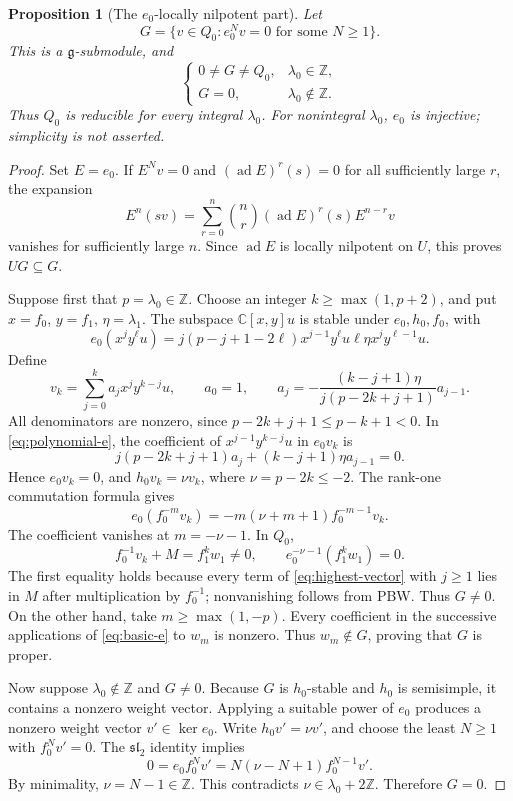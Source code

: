 \documentclass[11pt,a4paper]{article}
\newcommand{\C}{\mathbb C}
\newcommand{\Z}{\mathbb Z}
\newcommand{\g}{\mathfrak g}
\newcommand{\slc}{\mathfrak{sl}_2}
\newcommand{\ad}{\operatorname{ad}}
\theoremstyle{plainupright}
\newtheorem{proposition}{Proposition}[section]
\begin{document}
\begin{proposition}[The \(e_0\)-locally nilpotent part]\label{prop:integer}
Let
\[
G=\{v\in Q_0:e_0^Nv=0\text{ for some }N\ge1\}.
\]
This is a \(\g\)-submodule, and
\[
\begin{cases}
0\ne G\ne Q_0,&\lambda_0\in\Z,\\
G=0,&\lambda_0\notin\Z.
\end{cases}
\]
Thus \(Q_0\) is reducible for every integral \(\lambda_0\).
For nonintegral \(\lambda_0\), \(e_0\) is injective; simplicity is not
asserted.
\end{proposition}
\begin{proof}
Set \(E=e_0\). If \(E^Nv=0\) and \((\ad E)^r(s)=0\) for all sufficiently
large \(r\), the expansion
\[
E^n(sv)=\sum_{r=0}^n\binom nr(\ad E)^r(s)E^{n-r}v
\]
vanishes for sufficiently large \(n\). Since \(\ad E\) is locally
nilpotent on \(U\), this proves \(UG\subseteq G\).

Suppose first that \(p=\lambda_0\in\Z\). Choose an integer
\(k\ge\max(1,p+2)\), and put \(x=f_0\), \(y=f_1\), \(\eta=\lambda_1\).
The subspace \(\C[x,y]u\) is stable under \(e_0,h_0,f_0\), with
\begin{equation}\label{eq:polynomial-e}
e_0(x^jy^\ell u)
=j(p-j+1-2\ell)x^{j-1}y^\ell u
 \ell\eta x^jy^{\ell-1}u.
\end{equation}
Define
\begin{equation}\label{eq:highest-vector}
v_k=\sum_{j=0}^k a_jx^jy^{k-j}u,\qquad
a_0=1,\qquad
a_j=-\frac{(k-j+1)\eta}{j(p-2k+j+1)}a_{j-1}.
\end{equation}
All denominators are nonzero, since
\(p-2k+j+1\le p-k+1<0\). In \eqref{eq:polynomial-e}, the coefficient of
\(x^{j-1}y^{k-j}u\) in \(e_0v_k\) is
\[
j(p-2k+j+1)a_j+(k-j+1)\eta a_{j-1}=0.
\]
Hence \(e_0v_k=0\), and \(h_0v_k=\nu v_k\), where \(\nu=p-2k\le-2\).
The rank-one commutation formula gives
\[
e_0(f_0^{-m}v_k)=-m(\nu+m+1)f_0^{-m-1}v_k.
\]
The coefficient vanishes at \(m=-\nu-1\). In \(Q_0\),
\[
f_0^{-1}v_k+M=f_1^kw_1\ne0,\qquad
e_0^{-\nu-1}(f_1^kw_1)=0.
\]
The first equality holds because every term of \eqref{eq:highest-vector}
with \(j\ge1\) lies in \(M\) after multiplication by \(f_0^{-1}\);
nonvanishing follows from PBW. Thus \(G\ne0\).
On the other hand, take \(m\ge\max(1,-p)\). Every coefficient in the
successive applications of \eqref{eq:basic-e} to \(w_m\) is nonzero.
Thus \(w_m\notin G\), proving that \(G\) is proper.

Now suppose \(\lambda_0\notin\Z\) and \(G\ne0\).
Because \(G\) is \(h_0\)-stable and \(h_0\) is semisimple, it contains
a nonzero weight vector. Applying a suitable power of \(e_0\) produces
a nonzero weight vector \(v'\in\ker e_0\). Write \(h_0v'=\nu v'\),
and choose the least \(N\ge1\) with \(f_0^Nv'=0\).
The \(\slc\) identity implies
\[
0=e_0f_0^Nv'=N(\nu-N+1)f_0^{N-1}v'.
\]
By minimality, \(\nu=N-1\in\Z\). This contradicts
\(\nu\in\lambda_0+2\Z\). Therefore \(G=0\).
\end{proof}
\end{document}
